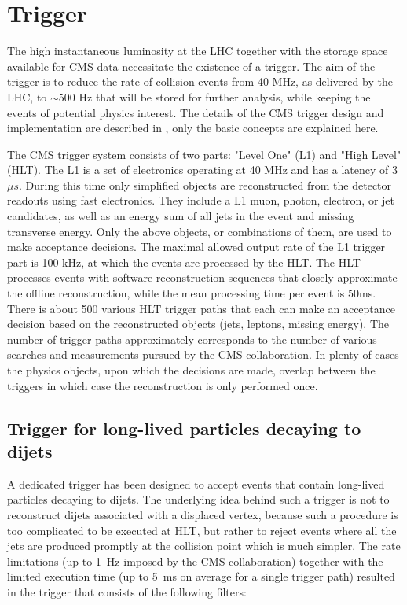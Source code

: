 \section{Trigger}

The high instantaneous luminosity at the LHC together with the storage space available for
CMS data necessitate the existence of a trigger.
 The aim of the trigger is to reduce the rate
of collision events from 40 MHz, as delivered by the LHC, to $\sim500$ Hz that will be stored
for further analysis, while keeping the events of potential physics interest.
The details of the CMS trigger design and implementation are described in \cite{Cittolin:578006},
only the basic concepts are explained here. 

The CMS trigger system consists of two parts: "Level One" (L1) and "High Level" (HLT).
The L1 is a set of electronics operating at 40 MHz and has a latency of 3~$\mu s$. During this
time only simplified 
objects are reconstructed from the detector readouts using fast electronics.
 They include a L1 muon, photon, 
electron, or jet candidates, as well as an energy sum of all jets in the event 
and missing transverse energy.
Only the above objects, or combinations of them, are used to make acceptance decisions. 
The maximal allowed output
rate of the L1 trigger part is 100 kHz, at which the events are processed by the HLT.
The HLT processes events with software reconstruction sequences that closely approximate
the offline reconstruction, while the mean processing time per event is 50ms. There is about 
500 various HLT trigger paths that each can make an acceptance decision based 
on the reconstructed objects
(jets, leptons, missing energy). The number of trigger paths approximately corresponds to the
number of various searches and measurements pursued by the CMS collaboration.
In plenty of cases the physics objects,
upon which the decisions are made, overlap between the triggers in which case the reconstruction 
is only performed once.


\subsection{Trigger for long-lived particles decaying to dijets}
\label{subsec:trigger}

A dedicated trigger has been designed to accept events that contain long-lived particles 
decaying to dijets. 
The underlying idea behind such a trigger is not to reconstruct dijets
associated with a displaced vertex, because such a procedure is too complicated to be executed 
at HLT, but rather to reject events where all the jets are produced promptly at the collision
point which is much simpler. The rate limitations (up to 1~Hz imposed by the CMS collaboration)
 together with the limited execution time (up to 5~ms on average for a single trigger path)
resulted in the trigger that consists of the following filters:


